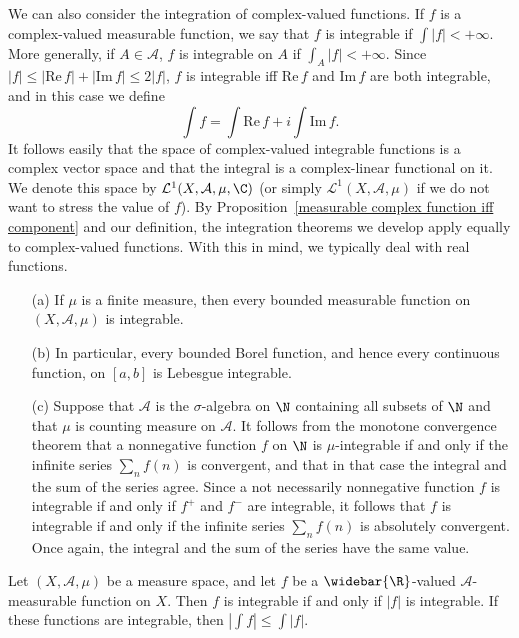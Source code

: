 \begin{remark}
We can also consider the integration of complex-valued functions. If $f$ is a complex-valued measurable function, we say that $f$ is integrable if $\int|f|<+\infty$. More generally, if $A\in\mathcal{A}$, $f$ is integrable on $A$ if $\int_A|f|<+\infty$. Since $|f|\leq|\mathrm{Re}\,f|+|\mathrm{Im}\,f|\leq 2|f|$, $f$ is integrable iff $\mathrm{Re}\, f$ and $\mathrm{Im}\, f$ are both integrable, and in this case we define
\[\int f=\int\mathrm{Re}\,f+i\int\mathrm{Im}\,f.\]
It follows easily that the space of complex-valued integrable functions is a complex vector space and that the integral is a complex-linear functional on it. We denote this space by $\mathcal{L}^1(X,\mathcal{A},\mu,\C)$ (or simply $\mathcal{L}^1(X,\mathcal{A},\mu)$ if we do not want to stress the value of $f$). By Proposition~\ref{measurable complex function iff component} and our definition, the integration theorems we develop apply equally to complex-valued functions. With this in mind, we typically deal with real functions.
\end{remark}
\begin{example}
\mbox{}
\begin{itemize}
\item[(a)] If $\mu$ is a finite measure, then every bounded measurable function on $(X,\mathcal{A},\mu)$ is integrable.
\item[(b)] In particular, every bounded Borel function, and hence every continuous function, on $[a,b]$ is Lebesgue integrable.
\item[(c)] Suppose that $\mathcal{A}$ is the $\sigma$-algebra on $\N$ containing all subsets of $\N$ and that $\mu$ is counting measure on $\mathcal{A}$. It follows from the monotone convergence theorem that a nonnegative function $f$ on $\N$ is $\mu$-integrable if and only if the infinite series $\sum_nf(n)$ is convergent, and that in that case the integral and the sum of the series agree. Since a not necessarily nonnegative function $f$ is integrable if and only if $f^+$ and $f^-$ are integrable, it follows that $f$ is integrable if and only if the infinite series $\sum_nf(n)$ is absolutely convergent. Once again, the integral and the sum of the series have the same value.
\end{itemize}
\end{example}
\begin{proposition}\label{integrable iff |f|}
Let $(X,\mathcal{A},\mu)$ be a measure space, and let $f$ be a $\widebar{\R}$-valued $\mathcal{A}$-measurable function on $X$. Then $f$ is integrable if and only if $|f|$ is integrable. If these functions are integrable, then $|\int f|\leq\int |f|$.
\end{proposition}
